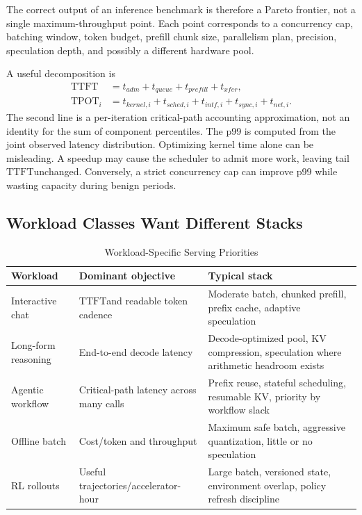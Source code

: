 \documentclass[journal]{IEEEtran}
\newcommand{\TTFT}{\ensuremath{\mathrm{TTFT}}}
\newcommand{\TPOT}{\ensuremath{\mathrm{TPOT}}}
\begin{document}
The correct output of an inference benchmark is therefore a Pareto frontier, not a single maximum-throughput point. Each point corresponds to a concurrency cap, batching window, token budget, prefill chunk size, parallelism plan, precision, speculation depth, and possibly a different hardware pool.

A useful decomposition is
\begin{align}
\TTFT &= t_{adm}+t_{queue}+t_{prefill}+t_{xfer}, \\
\TPOT_i &= t_{kernel,i}+t_{sched,i}+t_{intf,i}+t_{sync,i}+t_{net,i}.
\label{eq:latency-decomp}
\end{align}
The second line is a per-iteration critical-path accounting approximation, not an identity for the sum of component percentiles. The p99 is computed from the joint observed latency distribution. Optimizing kernel time alone can be misleading. A speedup may cause the scheduler to admit more work, leaving tail \TTFT unchanged. Conversely, a strict concurrency cap can improve p99 while wasting capacity during benign periods.

\subsection{Workload Classes Want Different Stacks}
\begin{table}[t]
\caption{Workload-Specific Serving Priorities}
\label{tab:workloads}
\centering
\scriptsize
\begin{tabularx}{\columnwidth}{@{}p{}p{}X@{}}
\toprule
Workload & Dominant objective & Typical stack \\
\midrule
Interactive chat & \TTFT and readable token cadence & Moderate batch, chunked prefill, prefix cache, adaptive speculation \\
Long-form reasoning & End-to-end decode latency & Decode-optimized pool, KV compression, speculation where arithmetic headroom exists \\
Agentic workflow & Critical-path latency across many calls & Prefix reuse, stateful scheduling, resumable KV, priority by workflow slack \\
Offline batch & Cost/token and throughput & Maximum safe batch, aggressive quantization, little or no speculation \\
RL rollouts & Useful trajectories/accelerator-hour & Large batch, versioned state, environment overlap, policy refresh discipline \\
\bottomrule
\end{tabularx}
\end{table}
\end{document}
